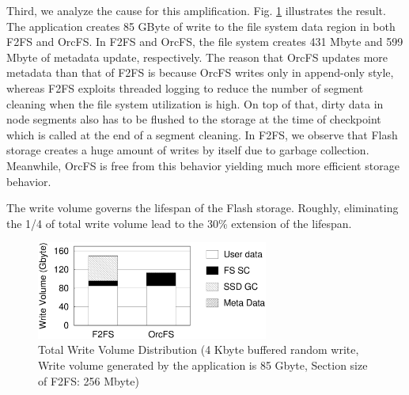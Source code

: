 \documentclass[prodmode,acmtecs]{acmsmall}
\begin{document}
Third, we analyze the cause for this
amplification. Fig. \ref{fig:io_distribution} illustrates the
result. The application creates 85 GByte of write to the file system
data region in both F2FS and OrcFS. In F2FS and OrcFS, the file system
creates 431 Mbyte and 599 Mbyte of metadata update, respectively.  The
reason that OrcFS updates more metadata than that of F2FS is because
OrcFS writes only in append-only style, whereas F2FS exploits threaded
logging \cite{lee2015f2fs} to reduce the number of segment cleaning
when the file system utilization is high. On top of that, dirty data
in node segments also has to be flushed to the storage at the time of
checkpoint which is called at the end of a segment cleaning.  In F2FS,
we observe that Flash storage creates a huge amount of writes by itself
due to garbage collection. Meanwhile, OrcFS is free from this behavior
yielding much more efficient storage behavior.

The write volume governs the lifespan of the Flash storage. Roughly,
eliminating the 1/4 of total write volume lead to the 30\% extension
of the lifespan.



\begin{figure}[t]
\begin{center}
\includegraphics[width=3in]{./comp_gc/io_distribution.eps}
\caption{Total Write Volume Distribution (4 Kbyte buffered random
  write, Write volume generated by the application is 85 Gbyte,
  Section size of F2FS: 256 Mbyte)}
\label{fig:io_distribution}
\end{center}
\end{figure}

\end{document}
